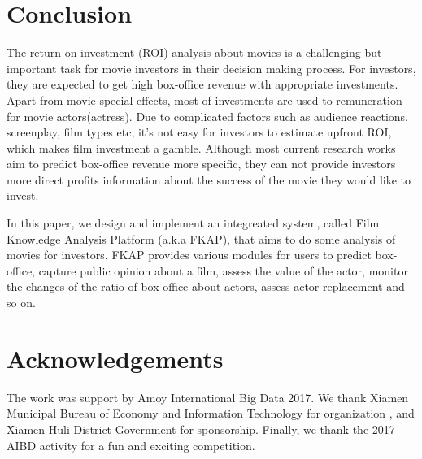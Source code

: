 \section{Conclusion}
\label{sec:conclu}
The return on investment (ROI) analysis about movies is a challenging but important task for movie investors in their decision making process. For investors, they are expected to get high box-office revenue with appropriate investments. Apart from movie special effects, most of investments are used to remuneration for movie actors(actress). Due to complicated factors such as audience reactions, screenplay, film types etc, it's not easy for investors to estimate upfront ROI, which makes film investment a gamble. Although most current research works aim to predict box-office revenue more specific, they can not provide investors more direct profits information about the success of the movie they would like to invest.
\par In this paper, we design and implement an integreated system, called Film Knowledge Analysis Platform (a.k.a FKAP), that aims to do some analysis of movies for investors. FKAP provides various modules for users to predict box-office, capture public opinion about a film, assess the value of the actor, monitor the changes of the ratio of box-office about actors, assess actor replacement and so on.
\section{Acknowledgements}
The work was support by Amoy International Big Data 2017. We thank Xiamen Municipal Bureau of Economy and Information Technology for organization , and Xiamen Huli District Government for sponsorship. Finally, we thank the 2017 AIBD activity for a fun and exciting competition. 